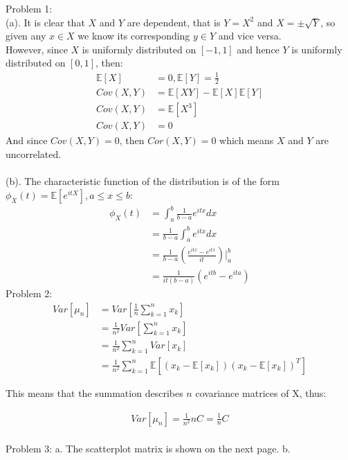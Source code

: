 \documentclass[12pt]{article}
\begin{document}
Problem 1:\\
(a). It is clear that $X$ and $Y$ are dependent, that is $Y = X^2$ and $X = \pm\sqrt{Y}$, so given any $x \in X$ we know its corresponding $y \in Y$ and vice versa.\\
However, since $X$ is uniformly distributed on $[-1,1]$ and hence $Y$ is uniformly distributed on $[0,1]$, then:
\begin{align} \nonumber
\mathbb{E}[X] &= 0, \mathbb{E}[Y] = \frac{1}{2} \\ \nonumber
Cov(X,Y) &= \mathbb{E}[XY] - \mathbb{E}[X]\mathbb{E}[Y] \\ \nonumber
Cov(X,Y) &= \mathbb{E}[X^3] \\ \nonumber
Cov(X,Y) &= 0
\end{align}
And since $Cov(X,Y) = 0$, then $Cor(X,Y) = 0$ which means $X$ and $Y$ are uncorrelated. \\ \\
(b). The characteristic function of the distribution is of the form $\phi_X(t) = \mathbb{E}[e^{itX}], a \leq x \leq b $:
\begin{align} \nonumber
\phi_X(t) &= \int_a^b\frac{1}{b-a}e^{itx}dx \\ \nonumber
&= \frac{1}{b-a}\int_a^b e^{itx}dx \\ \nonumber
&= \frac{1}{b-a}(\frac{e^{itx} - e^{itx}}{it})\big|_a^b \\ \nonumber
&= \frac{1}{it(b-a)}(e^{itb}-e^{ita})
\end{align}
Problem 2:
\begin{align} \nonumber
Var[\mu_n] &= Var[\frac{1}{n}\sum_{k=1}^n x_k] \\ \nonumber
&= \frac{1}{n^2}Var[\sum_{k=1}^nx_k] \\ \nonumber
&= \frac{1}{n^2}\sum_{k=1}^n Var[x_k] \\ \nonumber
&= \frac{1}{n^2}\sum_{k=1}^n \mathbb{E}[(x_k - \mathbb{E}[x_k])(x_k - \mathbb{E}[x_k])^T]
\end{align}
\begin{center}
This means that the summation describes $n$ covariance matrices of X, thus:
\end{center}
\begin{align} \nonumber
Var[\mu_n] = \frac{1}{n^2}nC = \frac{1}{n}C
\end{align}
\\ Problem 3:
a. The scatterplot matrix is shown on the next page.
\newpage
b.  \\
\end{document}
